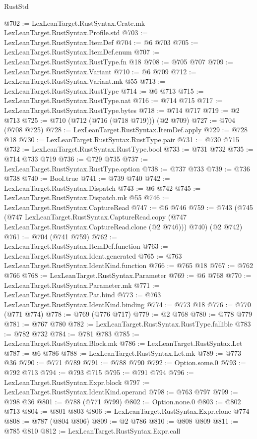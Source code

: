 \begin{lexlean}{RustStd}
\begin{coremodule}
@702 := LexLeanTarget.RustSyntax.Crate.mk LexLeanTarget.RustSyntax.Profile.std
@703 := LexLeanTarget.RustSyntax.ItemDef
@704 := @6 @703
@705 := LexLeanTarget.RustSyntax.ItemDef.enum
@707 := LexLeanTarget.RustSyntax.RustType.fn @18
@708 := @705 @707
@709 := LexLeanTarget.RustSyntax.Variant
@710 := @6 @709
@712 := LexLeanTarget.RustSyntax.Variant.mk @55
@713 := LexLeanTarget.RustSyntax.RustType
@714 := @6 @713
@715 := LexLeanTarget.RustSyntax.RustType.nat
@716 := @714 @715
@717 := LexLeanTarget.RustSyntax.RustType.bytes
@718 := @714 @717
@719 := @2 @713
@725 := @710 (@712 (@716 (@718 @719))) (@2 @709)
@727 := @704 (@708 @725)
@728 := LexLeanTarget.RustSyntax.ItemDef.apply
@729 := @728 @18
@730 := LexLeanTarget.RustSyntax.RustType.pair
@731 := @730 @715
@732 := LexLeanTarget.RustSyntax.RustType.bool
@733 := @731 @732
@735 := @714 @733 @719
@736 := @729 @735
@737 := LexLeanTarget.RustSyntax.RustType.option
@738 := @737 @733
@739 := @736 @738
@740 := Bool.true
@741 := @739 @740
@742 := LexLeanTarget.RustSyntax.Dispatch
@743 := @6 @742
@745 := LexLeanTarget.RustSyntax.Dispatch.mk @55
@746 := LexLeanTarget.RustSyntax.CaptureRead
@747 := @6 @746
@759 := @743
    (@745
      (@747
        LexLeanTarget.RustSyntax.CaptureRead.copy
        (@747 LexLeanTarget.RustSyntax.CaptureRead.clone (@2 @746)))
      @740)
    (@2 @742)
@761 := @704 (@741 @759)
@762 := LexLeanTarget.RustSyntax.ItemDef.function
@763 := LexLeanTarget.RustSyntax.Ident.generated
@765 := @763 LexLeanTarget.RustSyntax.IdentKind.function
@766 := @765 @18
@767 := @762 @766
@768 := LexLeanTarget.RustSyntax.Parameter
@769 := @6 @768
@770 := LexLeanTarget.RustSyntax.Parameter.mk
@771 := LexLeanTarget.RustSyntax.Pat.bind
@773 := @763 LexLeanTarget.RustSyntax.IdentKind.binding
@774 := @773 @18
@776 := @770 (@771 @774)
@778 := @769 (@776 @717)
@779 := @2 @768
@780 := @778 @779
@781 := @767 @780
@782 := LexLeanTarget.RustSyntax.RustType.fallible
@783 := @782 @732
@784 := @781 @783
@785 := LexLeanTarget.RustSyntax.Block.mk
@786 := LexLeanTarget.RustSyntax.Let
@787 := @6 @786
@788 := LexLeanTarget.RustSyntax.Let.mk
@789 := @773 @36
@790 := @771 @789
@791 := @788 @790
@792 := Option.some.{0}
@793 := @792 @713
@794 := @793 @715
@795 := @791 @794
@796 := LexLeanTarget.RustSyntax.Expr.block
@797 := LexLeanTarget.RustSyntax.IdentKind.operand
@798 := @763 @797
@799 := @798 @36
@801 := @788 (@771 @799)
@802 := Option.none.{0}
@803 := @802 @713
@804 := @801 @803
@806 := LexLeanTarget.RustSyntax.Expr.clone @774
@808 := @787 (@804 @806)
@809 := @2 @786
@810 := @808 @809
@811 := @785 @810
@812 := LexLeanTarget.RustSyntax.Expr.call

\end{coremodule}
\end{lexlean}
